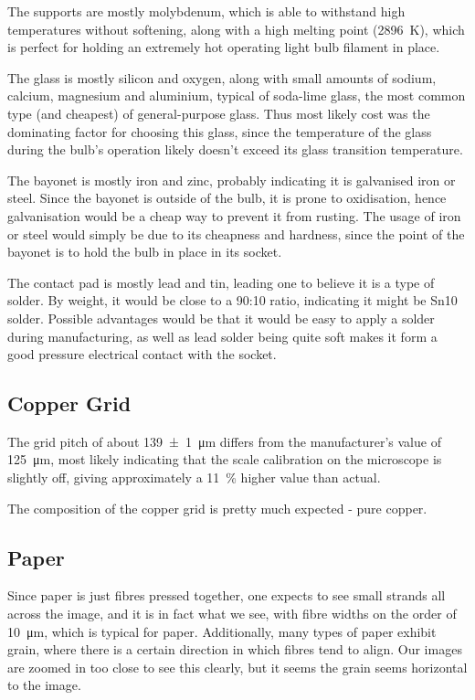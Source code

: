\documentclass[a4paper]{scrartcl}
\begin{document}
The supports are mostly molybdenum, which is able to withstand high temperatures without softening, along with a high melting point (\SI{2896}{\kelvin}), which is perfect for holding an extremely hot operating light bulb filament in place.

The glass is mostly silicon and oxygen, along with small amounts of sodium, calcium, magnesium and aluminium, typical of soda-lime glass, the most common type (and cheapest) of general-purpose glass. Thus most likely cost was the dominating factor for choosing this glass, since the temperature of the glass during the bulb's operation likely doesn't exceed its glass transition temperature.

The bayonet is mostly iron and zinc, probably indicating it is galvanised iron or steel. Since the bayonet is outside of the bulb, it is prone to oxidisation, hence galvanisation would be a cheap way to prevent it from rusting. The usage of iron or steel would simply be due to its cheapness and hardness, since the point of the bayonet is to hold the bulb in place in its socket.

The contact pad is mostly lead and tin, leading one to believe it is a type of solder. By weight, it would be close to a 90:10 ratio, indicating it might be Sn10 solder. Possible advantages would be that it would be easy to apply a solder during manufacturing, as well as lead solder being quite soft makes it form a good pressure electrical contact with the socket.

\subsection{Copper Grid}
The grid pitch of about \SI{139 \pm 1}{\micro\metre} differs from the manufacturer's value of \SI{125}{\micro\metre}, most likely indicating that the scale calibration on the microscope is slightly off, giving approximately a \SI{11}{\percent} higher value than actual.

The composition of the copper grid is pretty much expected - pure copper.

\subsection{Paper}
Since paper is just fibres pressed together, one expects to see small strands all across the image, and it is in fact what we see, with fibre widths on the order of \SI{10}{\micro\metre}, which is typical for paper. Additionally, many types of paper exhibit grain, where there is a certain direction in which fibres tend to align. Our images are zoomed in too close to see this clearly, but it seems the grain seems horizontal to the image.
\end{document}
